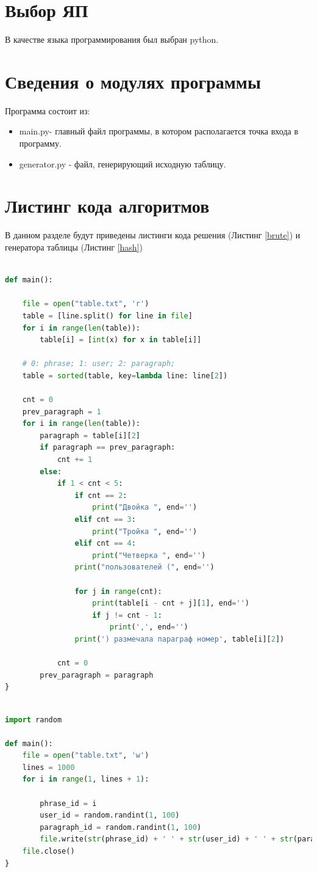 \documentclass[12pt]{report}
\begin{document}
\section{Выбор ЯП}
В качестве языка программирования был выбран python.
\section{Сведения о модулях программы}
Программа состоит из:
\begin{itemize}
	\item main.py- главный файл программы, в котором располагается точка входа в программу.
	\item generator.py - файл, генерирующий исходную таблицу.
\end{itemize}
\section{Листинг кода алгоритмов}
В данном разделе будут приведены листинги кода решения (Листинг \ref{brute}) и генератора таблицы (Листинг \ref{hash})
\begin{lstlisting}[label=brute,caption = Поиск, language = python]

def main():

    file = open("table.txt", 'r')
    table = [line.split() for line in file]
    for i in range(len(table)):
        table[i] = [int(x) for x in table[i]]

    # 0: phrase; 1: user; 2: paragraph;
    table = sorted(table, key=lambda line: line[2])

    cnt = 0
    prev_paragraph = 1
    for i in range(len(table)):
        paragraph = table[i][2]
        if paragraph == prev_paragraph:
            cnt += 1
        else:
            if 1 < cnt < 5:
                if cnt == 2:
                    print("Двойка ", end='')
                elif cnt == 3:
                    print("Тройка ", end='')
                elif cnt == 4:
                    print("Четверка ", end='')
                print("пользователей (", end='')

                for j in range(cnt):
                    print(table[i - cnt + j][1], end='')
                    if j != cnt - 1:
                        print(',', end='')
                print(') размечала параграф номер', table[i][2])

            cnt = 0
        prev_paragraph = paragraph
}
\end{lstlisting}

\begin{lstlisting}[label=hash,caption = Генератор, language = python]

import random

def main():
    file = open("table.txt", 'w')
    lines = 1000
    for i in range(1, lines + 1):

        phrase_id = i
        user_id = random.randint(1, 100)
        paragraph_id = random.randint(1, 100)
        file.write(str(phrase_id) + ' ' + str(user_id) + ' ' + str(paragraph_id) + '\n')
    file.close()
} 
\end{lstlisting}
\end{document}
